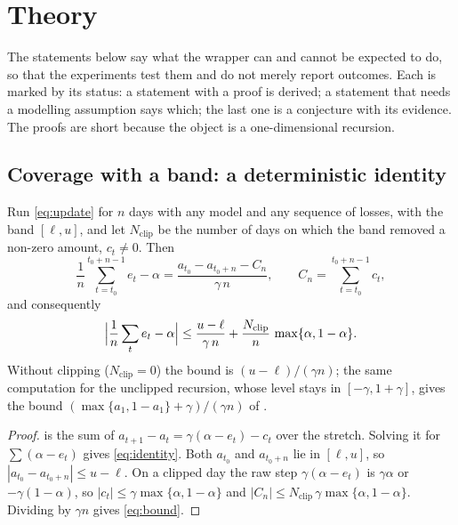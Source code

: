 \section{Theory}
\label{sec:theory}

The statements below say what the wrapper can and cannot be expected to do, so that the experiments test them and do not merely report outcomes. Each is marked by its status: a statement with a proof is derived; a statement that needs a modelling assumption says which; the last one is a conjecture with its evidence. The proofs are short because the object is a one-dimensional recursion.

\subsection{Coverage with a band: a deterministic identity}
\label{sec:theory-identity}

\begin{proposition}
\label{prop:identity}
Run \cref{eq:update} for $n$ days with any model and any sequence of losses, with the band $[\ell, u]$, and let $N_{\mathrm{clip}}$ be the number of days on which the band removed a non-zero amount, $c_t \ne 0$. Then
\begin{equation}
\frac{1}{n}\sum_{t=t_0}^{t_0+n-1} e_t - \alpha = \frac{a_{t_0} - a_{t_0+n} - C_n}{\gamma\, n}, \qquad C_n = \sum_{t=t_0}^{t_0+n-1} c_t,
\label{eq:identity}
\end{equation}
and consequently
\begin{equation}
\Bigl|\frac{1}{n}\sum_{t} e_t - \alpha\Bigr| \le \frac{u - \ell}{\gamma\, n} + \frac{N_{\mathrm{clip}}}{n}\,\max\{\alpha, 1-\alpha\}.
\label{eq:bound}
\end{equation}
Without clipping ($N_{\mathrm{clip}} = 0$) the bound is $(u-\ell)/(\gamma n)$; the same computation for the unclipped recursion, whose level stays in $[-\gamma, 1+\gamma]$, gives the bound $(\max\{a_1, 1-a_1\} + \gamma)/(\gamma n)$ of \citet{gibbs2021}.
\end{proposition}
\begin{proof}
 is the sum of $a_{t+1} - a_t = \gamma(\alpha - e_t) - c_t$ over the stretch. Solving it for $\sum (\alpha - e_t)$ gives \cref{eq:identity}. Both $a_{t_0}$ and $a_{t_0+n}$ lie in $[\ell, u]$, so $|a_{t_0} - a_{t_0+n}| \le u - \ell$. On a clipped day the raw step $\gamma(\alpha - e_t)$ is $\gamma\alpha$ or $-\gamma(1-\alpha)$, so $|c_t| \le \gamma\max\{\alpha, 1-\alpha\}$ and $|C_n| \le N_{\mathrm{clip}}\,\gamma\max\{\alpha, 1-\alpha\}$. Dividing by $\gamma n$ gives \cref{eq:bound}.
\end{proof}

